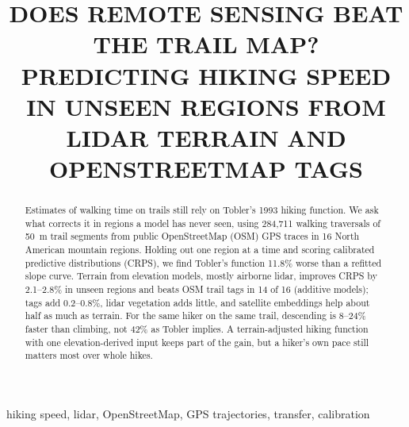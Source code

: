 \documentclass[conference,a4paper]{IEEEtran}
\begin{document}
\title{\uppercase{Does Remote Sensing Beat the Trail Map? Predicting Hiking
Speed in Unseen Regions from Lidar Terrain and OpenStreetMap Tags}}

\author{
}

\maketitle

\begin{abstract}
Estimates of walking time on trails still rely on Tobler's 1993 hiking
function. We ask what corrects it in regions a model has never seen, using
284,711 walking traversals of 50~m trail segments from public
OpenStreetMap (OSM) GPS traces in 16 North American mountain regions.
Holding out one region at a time and scoring calibrated predictive
distributions (CRPS), we find Tobler's function 11.8\% worse than a
refitted slope curve. Terrain from elevation models, mostly airborne
lidar, improves CRPS by 2.1--2.8\% in unseen regions and beats OSM trail
tags in 14 of 16 (additive models); tags add 0.2--0.8\%, lidar vegetation
adds little, and satellite embeddings help about half as much as terrain. For the same hiker on
the same trail, descending is 8--24\% faster than climbing, not 42\% as
Tobler implies. A terrain-adjusted hiking function with one
elevation-derived input keeps part of the gain, but a hiker's own pace still matters most over whole hikes.
\end{abstract}

\begin{IEEEkeywords}
hiking speed, lidar, OpenStreetMap, GPS trajectories, transfer, calibration
\end{IEEEkeywords}
\end{document}
